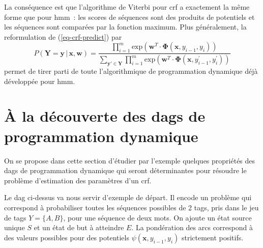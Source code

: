 \documentclass[11pt,openany]{book}
\newcommand{\ac}[1]{{\sc #1}} %
\begin{document}
La conséquence est que l'algorithme de Viterbi pour \ac{crf} a exactement la même forme que pour \ac{hmm}~:
les scores de séquences sont des produits de potentiels et les séquences sont comparées par la fonction maximum. Plus généralement, la reformulation de (\ref{eq-crf-predict}) par 
\begin{equation}
P(\mathbf{Y} = \mathbf{y} \,|\, \mathbf{x},\mathbf{w}) = \frac{\prod_{i=1}^m\text{exp}\left( \mathbf{w}^T \cdot \boldsymbol\Phi(\mathbf{x},y_{i-1},y_i)\right)}
{\sum_{\mathbf{y}'\in \mathbf{Y}}
\prod_{i=1}^m \text{exp}\left(\mathbf{w}^T \cdot \boldsymbol\Phi(\mathbf{x},y^{'}_{i-1},y^{'}_i)\right)}
\end{equation}
permet de tirer parti de toute l'algorithmique de programmation dynamique déjà développée pour \ac{hmm}.

\section{\`A la découverte des \ac{dag}s de programmation dynamique}

On se propose dans cette section d'étudier par l'exemple quelques propriétés des \ac{dags}
de programmation dynamique qui seront déterminantes pour résoudre le problème d'estimation des paramètres d'un \ac{crf}. 
\begin{center}
\end{center}
Le \ac{dag} ci-dessus va nous servir d'exemple de départ. Il encode un problème qui correspond à  probabiliser toutes les séquences possibles de 2 tags, pris dans le jeu de tags $Y=\{A,B\}$, pour une séquence de deux mots. On ajoute un état source unique $S$ et un état de but à atteindre $E$. La pondération des arcs correspond à des valeurs possibles pour des potentiels $\psi(\mathbf{x},y_{i-1},y_{i})$ strictement positifs.
 
\end{document}
